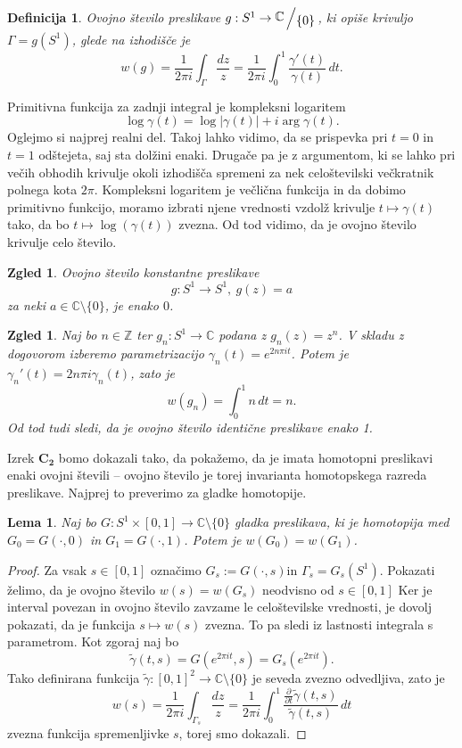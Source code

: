 \documentclass[10pt, a4paper]{article}
\newtheorem{defi}[izr]{Definicija}
\newenvironment{noticeB}{%
  \tcolorbox[%
  notitle,
  empty,
  enhanced,  %
  breakable,
  coltext=black,
  colback=white, 
  fontupper=\rmfamily,
  noparskip,
  sharp corners,
  boxrule=-1pt,  %
  frame hidden,
  left=7pt,  %
  right=7pt,
  top=5pt,
  bottom=5pt,
  before skip=2.5ex plus 2pt,
  after skip=2.5ex plus 2pt,
  borderline west = {1.5pt}{-0.1pt}{blue!30!black}, %
  overlay unbroken and last={%
    \draw[color=black, line width=1.25pt]
    ($(frame.south west)+(1.pt, -0.1pt)$) -- ++(2em, 0);
  }
  ]}
{\endtcolorbox}
\newenvironment{definicija}{\begin{noticeB}\begin{defi}}{%
\end{defi}\end{noticeB}}
\newtheorem{zgled}[izr]{Zgled}
\newtheorem{lema}[izr]{Lema}
\newenvironment{noticeC}{%
  \tcolorbox[%
  notitle,
  empty,
  enhanced,  %
  breakable,
  coltext=black, 
  fontupper=\rmfamily,
  noparskip,
  sharp corners,
  boxrule=-1pt,  %
  frame hidden,
  left=7pt,  %
  right=7pt,
  top=5pt,
  bottom=5pt,
  before skip=2.5ex plus 2pt,
  after skip=2.5ex plus 2pt,
  overlay unbroken and last={%
  },
  ]}
{\endtcolorbox}
\newenvironment{dokaz}%
  {\begin{noticeC}\begin{proof}}%
  {\end{proof}\end{noticeC}}
\newcommand{\Z}{\mathbb {Z}}
\newcommand{\C}{\mathbb {C}}
\newcommand{\quot}[2]{{\raisebox{0.1em}{$#1$}\left/\raisebox{-0.2em}{$#2$}\right.}}
\begin{document}
\begin{definicija}
  Ovojno število preslikave $g: S^1 \to \quot{\C}{\{0\}}$, ki opiše krivuljo $\Gamma = g(S^1)$, glede na izhodišče 
  je 
  $$w(g) = \frac{1}{2 \pi i} \int_{\Gamma} \frac{dz}{z} = \frac{1}{2 \pi i} \int_0 ^1 \frac{\gamma'(t)}{\gamma(t)}\, dt.$$
\end{definicija}

Primitivna funkcija za zadnji integral je kompleksni logaritem 
$$\log \gamma(t) = \log |\gamma(t)| + i \arg \gamma(t).$$
Oglejmo si najprej realni del. Takoj lahko vidimo, da se prispevka pri 
$t = 0$ in $t = 1$ odštejeta, saj sta dolžini enaki.
Drugače pa je z argumentom, ki se lahko pri večih obhodih
krivulje okoli izhodišča spremeni za nek celoštevilski večkratnik 
polnega kota $2 \pi$. Kompleksni logaritem je večlična funkcija in 
da dobimo primitivno funkcijo, moramo izbrati njene vrednosti vzdolž krivulje 
$t \mapsto \gamma(t)$ tako, da bo $t \mapsto \log(\gamma(t))$ zvezna.
Od tod vidimo, da je ovojno število krivulje celo število.

\begin{zgled}
  Ovojno število konstantne preslikave $$g: S^1 \to S^1,\ g(z) = a$$
  za neki $a \in \C \setminus \{0\}$, je enako $0$.
\end{zgled}

\begin{zgled}
  Naj bo $n \in \Z$ ter $g_n : S^1 \to \C$ podana z $g_n(z) = z^n$.
  V skladu z dogovorom izberemo parametrizacijo $\gamma_n(t) = e^{2 n \pi i t}$.
  Potem je $\gamma_n '(t) = 2 n \pi i \gamma_n (t)$, zato je 
  $$w (g_n) = \int_0 ^1 n\, dt = n.$$
  Od tod tudi sledi, da je ovojno število identične preslikave enako 1.
\end{zgled}

Izrek $\mathbf{C_2}$ bomo dokazali tako, da pokažemo, da je imata 
homotopni preslikavi enaki ovojni števili -- ovojno število je torej 
invarianta homotopskega razreda preslikave.
Najprej to preverimo za gladke homotopije.

\begin{lema}
  Naj bo $G: S^1 \times [0, 1] \to \C \setminus \{0\}$ gladka preslikava, ki je homotopija med 
  $G_0 = G(\cdot , 0)$ in $G_1 = G(\cdot , 1)$. Potem je $w (G_0) = w (G_1)$.
\end{lema}

\begin{dokaz}
  Za vsak $s \in [0, 1]$ označimo $G_s := G(\cdot, s)$in $\Gamma_s = G_s (S^1)$.
  Pokazati želimo, da je ovojno število $w(s) = w(G_s)$ neodvisno od $s \in [0, 1]$
  Ker je interval povezan in ovojno število zavzame le celoštevilske vrednosti,
  je dovolj pokazati, da je funkcija $s \mapsto w(s)$ zvezna. To pa sledi iz lastnosti 
  integrala s parametrom. Kot zgoraj naj bo 
  $$\widetilde{\gamma} (t, s) = G(e^{2 \pi i t}, s) = G_s (e^{2 \pi i t}).$$
  Tako definirana funkcija $\widetilde{\gamma}: [0, 1]^2 \to \C \setminus \{0\}$ je seveda zvezno odvedljiva,
  zato je 
  $$w(s) = \frac{1}{2 \pi i} \int_{\Gamma_s} \frac{dz}{z} = \frac{1}{2 \pi i} \int_0 ^1 \frac{\frac{\partial}{\partial t} \widetilde{\gamma} (t, s)}{\widetilde{\gamma} (t, s)}\, dt$$
  zvezna funkcija spremenljivke $s$, torej smo dokazali. 
\end{dokaz}
\end{document}
